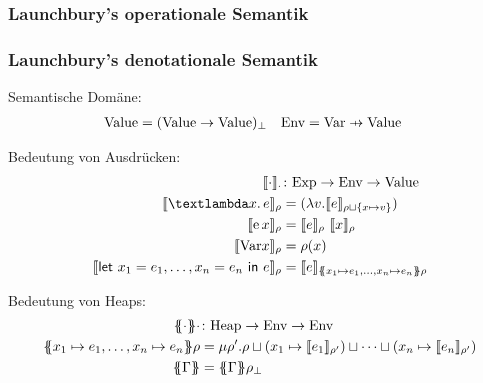 \documentclass{beamer}
\newcommand\pfun{\mathrel{\ooalign{\hfil$\mapstochar\mkern5mu$\hfil\cr$\to$\cr}}}
\begin{document}
\begin{frame}
\frametitle{Launchbury’s operationale Semantik}

\end{frame}


\newcommand{\dsem}[2]{\llbracket #1 \rrbracket_{#2}}
\newcommand{\esem}[1]{\{\!\!\{#1\}\!\!\}}

\begin{frame}
\frametitle{Launchbury’s denotationale Semantik}

Semantische Domäne:
\begin{align*}
\sValue &= (\sValue \to \sValue)_\bot &
\sEnv &= \sVar \pfun \sValue
\end{align*}

Bedeutung von Ausdrücken:
\begin{align*}
\dsem{\cdot}{\cdot} &\colon \sExp \to \sEnv \to \sValue \\
\dsem{\sLam xe}{\rho} &=
	(\lambda v. \dsem{e}{\rho \sqcup \{x \mapsto v\}})\\
\dsem{\sApp e x}\rho &= \dsem e\rho\
	\dsem x \rho \\
\dsem{\sVar x}\rho &= \rho (x)\\
\dsem{\sLet{x_1 = e_1,\ldots, x_n = e_n}e}\rho &= \dsem{e}{\esem{ x_1\mapsto e_1,\ldots,x_n\mapsto e_n}\rho}
\end{align*}

Bedeutung von Heaps:
\begin{align*}
\esem{\cdot}\cdot &\colon \sHeap \to \sEnv \to \sEnv \\
\esem{ x_1\mapsto e_1,\ldots,x_n\mapsto e_n}\rho
&= \mu \rho'. \rho \sqcup (x_1 \mapsto \dsem{e_1}{\rho'}) \sqcup \cdots \sqcup (x_n \mapsto \dsem{e_n}{\rho'})\\
\esem{\Gamma} &= \esem{\Gamma}{\rho_\bot}
\end{align*}
\end{frame}
\end{document}
